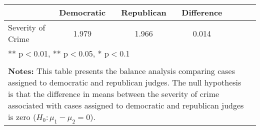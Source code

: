\begin{tabular}{l*{6}{c}}
                    &Democratic&Republican&  Difference   \\
\hline
Severity of Crime   &       1.979&       1.966&       0.014   \\
\multicolumn{6}{p{0.6\linewidth}}{\small *** p$<$0.01, ** p$<$0.05, * p$<$0.1} \\
\\
\multicolumn{6}{p{0.6\linewidth}}{\small \textbf{Notes:} This table presents the balance analysis comparing cases assigned to democratic and republican judges. The null hypothesis is that the difference in means between the severity of crime associated with cases assigned to democratic and republican judges is zero ($H_0: \mu_1 - \mu_2 = 0$).} \\
\end{tabular}
